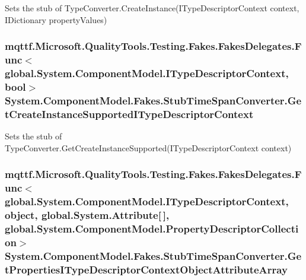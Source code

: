 Sets the stub of Type\-Converter.\-Create\-Instance(\-I\-Type\-Descriptor\-Context context, I\-Dictionary property\-Values)

\hypertarget{class_system_1_1_component_model_1_1_fakes_1_1_stub_time_span_converter_a707b84bdb57f16f734ab66e678529675}{
\subsubsection[{Get\-Create\-Instance\-Supported\-I\-Type\-Descriptor\-Context}]{\setlength{\rightskip}{0pt plus 5cm}mqttf.\-Microsoft.\-Quality\-Tools.\-Testing.\-Fakes.\-Fakes\-Delegates.\-Func$<$global.\-System.\-Component\-Model.\-I\-Type\-Descriptor\-Context, bool$>$ System.\-Component\-Model.\-Fakes.\-Stub\-Time\-Span\-Converter.\-Get\-Create\-Instance\-Supported\-I\-Type\-Descriptor\-Context}}\label{class_system_1_1_component_model_1_1_fakes_1_1_stub_time_span_converter_a707b84bdb57f16f734ab66e678529675}


Sets the stub of Type\-Converter.\-Get\-Create\-Instance\-Supported(\-I\-Type\-Descriptor\-Context context)

\hypertarget{class_system_1_1_component_model_1_1_fakes_1_1_stub_time_span_converter_a20a11459e6f21cb296efa41b6f4d12ec}{
\subsubsection[{Get\-Properties\-I\-Type\-Descriptor\-Context\-Object\-Attribute\-Array}]{\setlength{\rightskip}{0pt plus 5cm}mqttf.\-Microsoft.\-Quality\-Tools.\-Testing.\-Fakes.\-Fakes\-Delegates.\-Func$<$global.\-System.\-Component\-Model.\-I\-Type\-Descriptor\-Context, object, global.\-System.\-Attribute\mbox{[}$\,$\mbox{]}, global.\-System.\-Component\-Model.\-Property\-Descriptor\-Collection$>$ System.\-Component\-Model.\-Fakes.\-Stub\-Time\-Span\-Converter.\-Get\-Properties\-I\-Type\-Descriptor\-Context\-Object\-Attribute\-Array}}\label{class_system_1_1_component_model_1_1_fakes_1_1_stub_time_span_converter_a20a11459e6f21cb296efa41b6f4d12ec}


